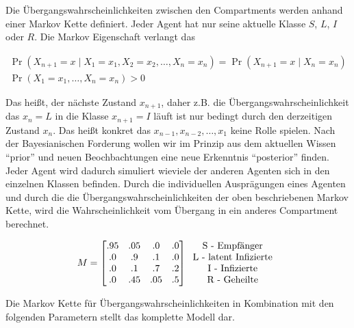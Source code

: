 \documentclass[paper=a4, fontsize=11pt, ngerman, abstract=on]{scrartcl}
\numberwithin{equation}{section} %
\numberwithin{figure}{section} %
\numberwithin{table}{section} %
\begin{document}
Die Übergangswahrscheinlichkeiten zwischen den Compartments werden anhand einer Markov Kette definiert. Jeder Agent hat nur seine aktuelle Klasse $S$, $L$, $I$ oder $R$. Die Markov Eigenschaft verlangt das

\begin{gather*}
\Pr(X_{n+1}=x\mid X_{1}=x_{1},X_{2}=x_{2},\ldots ,X_{n}=x_{n})=\Pr(X_{n+1}=x\mid X_{n}=x_{n}) \\
\Pr(X_{1}=x_{1},\ldots,X_{n}=x_{n})>0
\end{gather*}

Das heißt, der nächste Zustand $x_{n + 1}$, daher z.B. die Übergangswahrscheinlichkeit das $x_{n} = L$ in die Klasse $x_{n + 1} = I$ läuft ist nur bedingt durch den derzeitigen Zustand $x_{n}$. Das heißt konkret das $x_{n-1}, x_{n-2}, \ldots, x_{1}$ keine Rolle spielen. Nach der Bayesianischen Forderung wollen wir im Prinzip aus dem aktuellen Wissen ``prior'' und neuen Beochbachtungen eine neue Erkenntnis ``posterior'' finden. Jeder Agent wird dadurch simuliert wieviele der anderen Agenten sich in den einzelnen Klassen befinden. Durch die individuellen Ausprägungen eines Agenten und durch die die Übergangswahrscheinlichkeiten der oben beschriebenen Markov Kette, wird die Wahrscheinlichkeit vom Übergang in ein anderes Compartment berechnet.

\[
M=
  \begin{bmatrix}
    .95 & .05 & .0 & .0 \\
    .0 & .9 & .1 & .0 \\
    .0 & .1 & .7 & .2 \\
    .0 & .45 & .05 & .5 \\
  \end{bmatrix}
  \begin{tabular}{c}
    \text{S - Empfänger} \\
    \text{L - latent Infizierte} \\
    \text{I - Infizierte} \\
    \text{R - Geheilte}
  \end{tabular}
\]

Die Markov Kette für Übergangswahrscheinlichkeiten in Kombination mit den folgenden Parametern stellt das komplette Modell dar.
\end{document}
